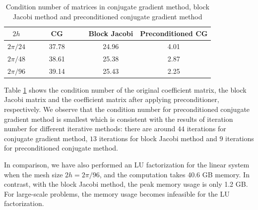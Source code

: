 \begin{table}[htbp]
	\begin{center}
		\begin{tabular}{|c|c c c|}
			\hline
			$2h$   & ~~~~ CG ~~~~& Block Jacobi & Preconditioned CG  \\
			\hline
			$2\pi/24$ &37.78& 24.96& 4.01\\
			\hline
			$2\pi/48$ &38.61 & 25.38 & 2.87\\
			\hline 
			$2\pi/96$ &39.14 &25.43 & 2.25\\
			\hline
		\end{tabular}
	\end{center}
	\caption{Condition number of matrices in conjugate gradient method, block Jacobi method and preconditioned conjugate gradient method}\label{condition_number}
\end{table} 
Table \ref{condition_number} shows the condition number of the original coefficient matrix, the block Jacobi matrix and the coefficient matrix after applying preconditioner, respectively. We observe that the condition number for preconditioned conjugate gradient method is smallest which is consistent with the results of iteration number for different iterative methods: there are around $44$ iterations for conjugate gradient method, $13$ iterations for block Jacobi method and $9$ iterations for preconditioned conjugate method.

In comparison, we have also performed an LU factorization for the linear system when the mesh size $2h = 2\pi/96$, and the computation takes 40.6 GB memory. In contrast, with the block Jacobi method, the peak memory usage is only 1.2 GB. For large-scale problems, the memory usage becomes infeasible for the LU factorization. 

